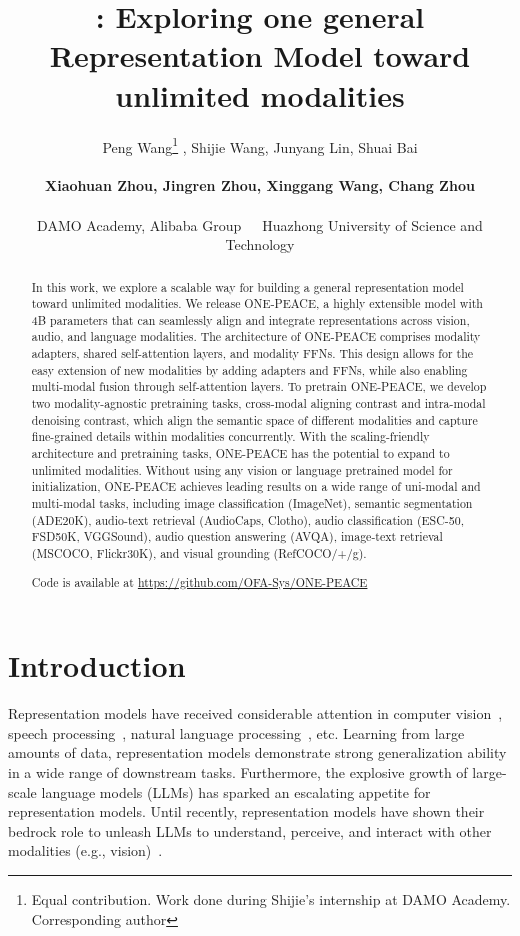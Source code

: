 \documentclass{article}
\title{{\modeltitle}: Exploring one general Representation Model toward unlimited modalities}
\author{
   Peng Wang\thanks{Equal contribution. Work done during Shijie’s internship at DAMO Academy. Corresponding author} ,
   Shijie Wang, Junyang Lin, Shuai Bai\\\\ 
   \textbf{Xiaohuan Zhou, Jingren Zhou, Xinggang Wang, Chang Zhou
   } \\\\
   DAMO Academy, Alibaba Group\ \ \ Huazhong University of Science and Technology
}
\newcommand{\onepeace}{ONE-PEACE\xspace}
\begin{document}
\maketitle


\begin{abstract}
In this work, we explore a scalable way for building a general representation model toward unlimited modalities.
We release \onepeace, a highly extensible model with 4B parameters that can seamlessly align and integrate representations across vision, audio, and language modalities.
The architecture of \onepeace comprises modality adapters, shared self-attention layers, and modality FFNs. 
This design allows for the easy extension of new modalities by adding adapters and FFNs, while also enabling multi-modal fusion through self-attention layers.
To pretrain \onepeace, we develop two modality-agnostic pretraining tasks, cross-modal aligning contrast and intra-modal denoising contrast, which align the semantic space of different modalities and capture fine-grained details within modalities concurrently.
With the scaling-friendly architecture and pretraining tasks, \onepeace has the potential to expand to unlimited modalities.
Without using any vision or language pretrained model for initialization, \onepeace achieves leading results on a wide range of uni-modal and multi-modal tasks, including image classification (ImageNet), semantic segmentation (ADE20K), audio-text retrieval (AudioCaps, Clotho), audio classification (ESC-50, FSD50K, VGGSound), audio question answering (AVQA), image-text retrieval (MSCOCO, Flickr30K), and visual grounding (RefCOCO/+/g).


\smallskip
\centering
Code is available at \url{https://github.com/OFA-Sys/ONE-PEACE}
\end{abstract}


\section{Introduction}
\label{sec:intro}

Representation models have received considerable attention in computer vision~\cite{beit,mae,ibot,moco,mocov2,mocov3,simclr,dino,dinov2}, speech processing~\cite{wav2vec,wav2vec2,wavlm,hubert}, natural language processing~\cite{elmo,bert,roberta,electra,deberta}, etc. 
Learning from large amounts of data, representation models demonstrate strong generalization ability in a wide range of downstream tasks.
Furthermore, the explosive growth of large-scale language models (LLMs) has sparked an escalating appetite for representation models.
Until recently, representation models have shown their bedrock role to unleash LLMs to understand, perceive, and interact with other modalities (e.g., vision)~\cite{gpt4,kosmos,blip2,minigpt4,llava,mplug-owl,palme}.
\end{document}
